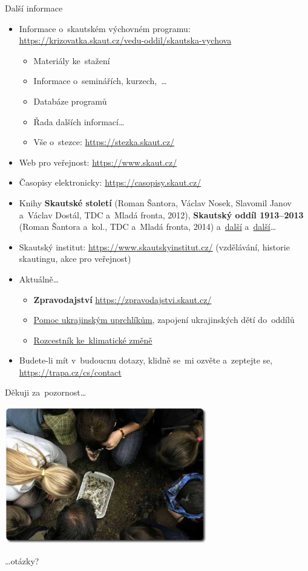 \documentclass[compress, ucs, xelatex, 11pt, xcolor=dvipsnames, print, aspectratio=169,
	hyperref={
		bookmarks=true,
		unicode=true,
		colorlinks=true,
		pdftitle={Skautska vychovna metoda},
		plainpages=false,
		pdfauthor={Vojtech Zeisek},
		pdfsubject={Skautska vychovna metoda a jeji vyvoj za posledni stoleti a desetileti},
		pdfcreator={XeLaTeX},
		pdfkeywords={Junak, Pedagogika, Skaut, Skauting, Vychovna metoda},
		linkcolor=Red, %
		anchorcolor=ForestGreen, %
		citecolor=ForestGreen, %
		filecolor=ForestGreen, %
		menucolor=ForestGreen, %
		urlcolor=Sepia, %
		pdftex},
	url={hyphens, lowtilde} %
	]{beamer}
\begin{document}
\begin{frame}[allowframebreaks]{Další informace}
	\begin{itemize}
		\item Informace o~skautském výchovném programu: \url{https://krizovatka.skaut.cz/vedu-oddil/skautska-vychova}
		\begin{itemize}
			\item Materiály ke~stažení
			\item Informace o~seminářích, kurzech,~\ldots
			\item Databáze programů
			\item Řada dalších informací\ldots
			\item Vše o~stezce: \url{https://stezka.skaut.cz/}
		\end{itemize}
		\item Web pro veřejnost: \url{https://www.skaut.cz/}
		\item Časopisy elektronicky: \url{https://casopisy.skaut.cz/}
		\item Knihy \textbf{Skautské století} (Roman Šantora, Václav Nosek, Slavomil Janov a~Václav Dostál, TDC a~Mladá fronta, 2012), \textbf{Skautský oddíl 1913--2013} (Roman Šantora a~kol., TDC a~Mladá fronta, 2014) a~\href{https://www.obchod.skaut.cz/publikace/}{další} a~\href{https://www.junshop.cz/volny-cas/knihy/}{další}\ldots
		\item Skautský institut: \url{https://www.skautskyinstitut.cz/} (vzdělávání, historie skautingu, akce pro veřejnost)
		\item Aktuálně\ldots
		\begin{itemize}
			\item \textbf{Zpravodajství} \url{https://zpravodajstvi.skaut.cz/}
			\item \href{https://krizovatka.skaut.cz/ukrajina}{Pomoc ukrajinským uprchlíkům}, zapojení ukrajinských dětí do~oddílů
			\item \href{https://krizovatka.skaut.cz/klimaticka-zmena/rozcestnik-ke-klimaticke-zmene}{Rozcestník ke~klimatické změně}
		\end{itemize}
		\item Budete-li mít v~budoucnu dotazy, klidně se~mi ozvěte a~zeptejte se, \url{https://trapa.cz/cs/contact}
	\end{itemize}
\end{frame}

\begin{frame}{Děkuji za~pozornost\ldots}
	\begin{center}
		\includegraphics[height=6cm]{zaver.jpg}
	\end{center}
	\begin{flushright}
		\begin{large}
			\ldots otázky?
		\end{large}
	\end{flushright}
\end{frame}
\end{document}

